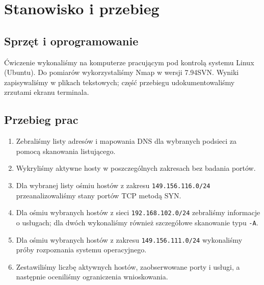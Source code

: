 \documentclass[11pt,a4paper]{article}
\begin{document}
\section{Stanowisko i przebieg}
\subsection{Sprzęt i oprogramowanie}
Ćwiczenie wykonaliśmy na komputerze pracującym pod kontrolą systemu Linux
(Ubuntu). Do pomiarów wykorzystaliśmy Nmap w wersji 7.94SVN. Wyniki zapisywaliśmy
w plikach tekstowych; część przebiegu udokumentowaliśmy zrzutami ekranu terminala.

\subsection{Przebieg prac}
\begin{enumerate}
  \item Zebraliśmy listy adresów i mapowania DNS dla wybranych podsieci za pomocą
        skanowania listującego.
  \item Wykryliśmy aktywne hosty w poszczególnych zakresach bez badania portów.
  \item Dla wybranej listy ośmiu hostów z zakresu \texttt{149.156.116.0/24}
        przeanalizowaliśmy stany portów TCP metodą SYN.
  \item Dla ośmiu wybranych hostów z sieci \texttt{192.168.102.0/24} zebraliśmy
        informacje o usługach; dla dwóch wykonaliśmy również szczegółowe skanowanie
        typu \texttt{-A}.
  \item Dla ośmiu wybranych hostów z zakresu \texttt{149.156.111.0/24} wykonaliśmy
        próby rozpoznania systemu operacyjnego.
  \item Zestawiliśmy liczbę aktywnych hostów, zaobserwowane porty i usługi,
        a następnie oceniliśmy ograniczenia wnioskowania.
\end{enumerate}
\end{document}
